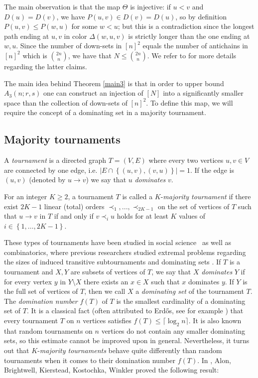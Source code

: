     The main observation is that the map $\Theta$ is injective: if $u < v$ and $D(u) = D(v)$, we have $P(u,v) \in D(v) = D(u)$, so by definition $P(u,v) \leq P(w,u)$ for some $w < u$; but this is a contradiction since the longest path ending at $u, v$ in color $\Delta(w,u,v)$ is strictly longer than the one ending at $w,u$.
    Since the number of down-sets in $[n]^2$ equals the number of antichains in $[n]^2$ which is $\binom{2n}{n}$, we have that $N \leq \binom{2n}{n}$. We refer to \cite{MS14} for more details regarding the latter claims. 


    The main idea behind Theorem \ref{main3} is that in order to upper bound $A_{3}(n;r,s)$ one can construct an injection of $[N]$ into a significantly smaller space than the collection of down-sets of $[n]^2$. To define this map, we will require the concept of a dominating set in a majority tournament. 
    
\subsection{Majority tournaments}

A {\it{tournament}} is a directed graph $T=(V,E)$ where every two vertices $u,v \in V$ are connected by one edge, i.e. $|E \cap \left\{(u,v),(v,u)\right\}|=1$. If the edge is $(u,v)$ (denoted by $u \to v$) we say that $u$ {\it{dominates}} $v$. 

\begin{definition}
    For an integer $K \geq 2$, a tournament $T$ is called a $K$-\textit{majority tournament} if there exist $2K-1$ linear (total) orders $\prec_1, ..., \prec_{2K-1}$ on the set of vertices of $T$ such that $u \to v$ in $T$ if and only if $v \prec_i u$ holds for at least $K$ values of $i \in \left\{1,\ldots,2K-1\right\}$. 
\end{definition}

These types of tournaments have been studied in social science~\cite{Mcg53} as well as combinatorics, where previous researchers studied extremal problems regarding the sizes of induced transitive subtournaments \cite{MSW11} and dominating sets \cite{ABKKW06}. If $T$ is a tournament and $X,Y$ are subsets of vertices of $T$, we say that $X$ {\it{dominates}} $Y$ if for every vertex $y$ in $Y \setminus X$ there exists an $x \in X$ such that $x$ dominates $y$. If $Y$ is the full set of vertices of $T$, then we call $X$ a {\it{dominating set}} of the tournament $T$. The {\it{domination number}} $f(T)$ of $T$ is the smallest cardinality of a dominating set of $T$. It is a classical fact (often attributed to Erd\H{o}s, see for example \cite{Moon68}) that every tournament $T$ on $n$ vertices satisfies $f(T) \leq \lceil \log_{2}{n} \rceil$. It is also known \cite{AS16} that random tournaments on $n$ vertices do not contain any smaller dominating sets, so this estimate cannot be improved upon in general. Nevertheless, it turns out that $K$-\textit{majority tournaments} behave quite differently than random tournaments when it comes to their domination number $f(T)$. In \cite{ABKKW06}, Alon, Brightwell, Kierstead, Kostochka, Winkler proved the following result:

